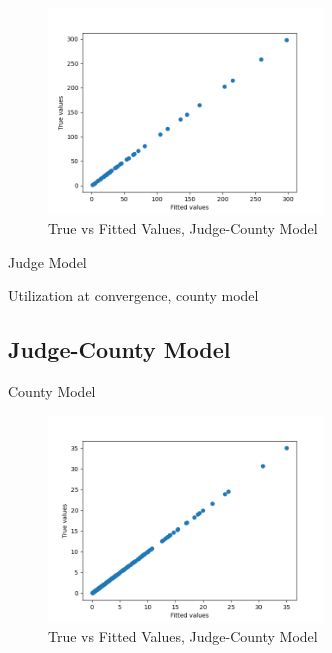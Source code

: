 \documentclass[11pt]{article}
\begin{document}
    \begin{figure}[H]
      \centering
      \includegraphics[width=0.65\textwidth]{../../../output/figures/Exploration/fit_utilization_County}
      \caption{True vs Fitted Values, Judge-County Model}
    \end{figure}

    \begin{table}[H]
      \centering
      \caption{Judge Model}
      
    \end{table}

    \begin{table}[H]
      \centering
      \small
      \caption{Utilization at convergence, county model}
      
    \end{table}

  \subsection{Judge-County Model}

    \begin{table}[H]
      \centering
      \caption{County Model}
      
    \end{table}

    \begin{figure}[H]
      \centering
      \includegraphics[width=0.65\textwidth]{../../../output/figures/Exploration/fit_utilization_JudgeIDCounty}
      \caption{True vs Fitted Values, Judge-County Model}
    \end{figure}
\end{document}
